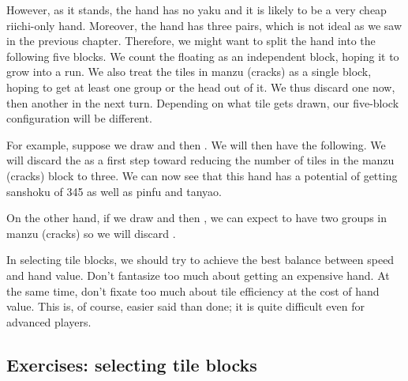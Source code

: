 \bigskip
However, as it stands, the hand has no {\jap yaku} and it is likely to be a very cheap riichi-only hand. Moreover, the hand has three pairs, which is not ideal as we saw in the previous chapter. 
Therefore, we might want to split the hand into the following five blocks. 
\emj
We count the floating {\LARGE{}} as an independent block, hoping it to grow into a run. We also treat the tiles in {\jap manzu} (cracks) as a single block, hoping to get at least one group or the head out of it. We thus discard one {\LARGE{}} now, then another {\LARGE{}} in the next turn. Depending on what tile gets drawn, our five-block configuration will be different. 

\bigskip
For example, suppose we draw {\LARGE{}} and then {\LARGE{}}. We will then have the following. 
\emj
We will discard the {\LARGE{}} as a first step toward reducing the number of tiles in the {\jap manzu} (cracks) block to three. We can now see that this hand has a potential of getting {\jap sanshoku} of 345 as well as {\jap pinfu} and {\jap tanyao}.

\bigskip
On the other hand, if we draw {\LARGE{}} and then {\LARGE{}}, we can expect to have two groups in {\jap manzu} (cracks) so we will discard {\LARGE{}}.
\emj
\vspace{-10pt}

In selecting tile blocks, we should try to achieve the best balance between speed and hand value. Don't fantasize too much about getting an expensive hand. At the same time, don't fixate too much about tile efficiency at the cost of hand value. This is, of course, easier said than done; it is quite difficult even for advanced players. 

\vfill

\subsection*{Exercises: selecting tile blocks}


